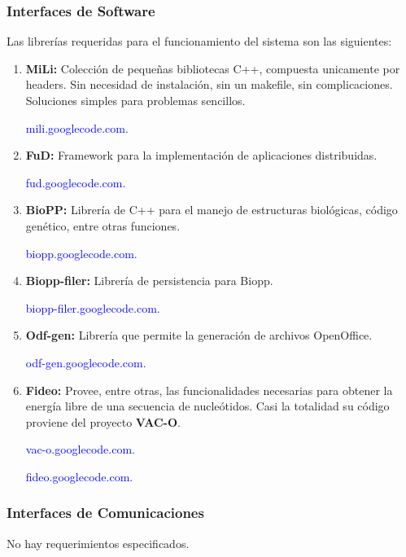 \documentclass[12pt,a4paper,spanish]{article}
\begin{document}
	\subsubsection{Interfaces de Software}
		\par Las librerías requeridas para el funcionamiento del sistema son las siguientes:
		\begin{enumerate} 		
			\item \textbf{MiLi:} Colección de pequeñas bibliotecas C++, compuesta unicamente por headers. Sin necesidad de instalación, sin un 									makefile, sin complicaciones. Soluciones simples para problemas sencillos.
						\par \noindent \textcolor{blue}{mili.googlecode.com.}

			\item \textbf{FuD:} Framework para la implementación de aplicaciones distribuidas. 
						\par \noindent \textcolor{blue}{fud.googlecode.com.}

			\item \textbf{BioPP:} Librería de C++ para el manejo de estructuras biológicas, código
						genético, entre otras funciones. 
						\par \noindent \textcolor{blue}{biopp.googlecode.com.}

			\item \textbf{Biopp-filer:} Librería de persistencia para Biopp. 
						\par \noindent \textcolor{blue}{biopp-filer.googlecode.com.} 

			\item \textbf{Odf-gen:} Librería que permite la generación de archivos OpenOffice.
						\par \noindent \textcolor{blue}{odf-gen.googlecode.com.}

			\item \textbf{Fideo:} Provee, entre otras, las funcionalidades necesarias para obtener la energía libre de una secuencia de nucleótidos.
								  Casi la totalidad su código proviene del proyecto \textbf{VAC-O}.
						\par \noindent \textcolor{blue}{vac-o.googlecode.com.}
						\par \noindent \textcolor{blue}{fideo.googlecode.com.}  
		\end{enumerate}

	\subsubsection{Interfaces de Comunicaciones}
		No hay requerimientos especificados.
\end{document}
